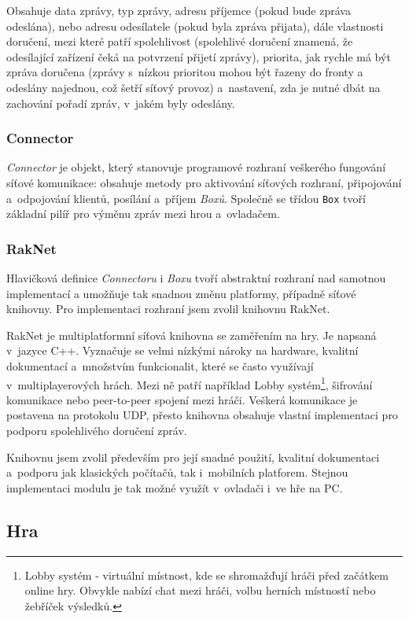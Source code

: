 \documentclass[thesis=B,czech,hidelinks]{FITthesis}[2012/06/26] %
\newcommand{\code}[1]{\texttt{#1}}
\begin{document}
Obsahuje data zprávy, typ zprávy, adresu příjemce (pokud bude zpráva odeslána), nebo adresu odesílatele (pokud byla zpráva přijata), dále vlastnosti doručení, mezi které patří spolehlivost (spolehlivé doručení znamená, že odesílající zařízení čeká na potvrzení přijetí zprávy), priorita, jak rychle má být zpráva doručena (zprávy s~nízkou prioritou mohou být řazeny do fronty a odeslány najednou, což šetří síťový provoz) a~nastavení, zda je nutné dbát na zachování pořadí zpráv, v~jakém byly odeslány.

\subsubsection{Connector}

\textit{Connector} je objekt, který stanovuje programové rozhraní veškerého fungování síťové komunikace: obsahuje metody pro aktivování síťových rozhraní, připojování a~odpojování klientů, posílání a~příjem \textit{Boxů}. Společně se třídou \code{Box} tvoří základní pilíř pro výměnu zpráv mezi hrou a~ovladačem.

\subsubsection{RakNet}

Hlavičková definice \textit{Connectoru} i \textit{Boxu} tvoří abstraktní rozhraní nad samotnou implementací a umožňuje tak snadnou změnu platformy, případně síťové knihovny. Pro implementaci rozhraní jsem zvolil knihovnu RakNet.

RakNet je multiplatformní síťová knihovna se zaměřením na hry. Je napsaná v~jazyce C++. Vyznačuje se velmi nízkými nároky na hardware, kvalitní dokumentací a~množstvím funkcionalit, které se často využívají v~multiplayerových hrách. \cite{raknet} Mezi ně patří například Lobby systém\footnote{Lobby systém - virtuální místnost, kde se shromažďují hráči před začátkem online hry. Obvykle nabízí chat mezi hráči, volbu herních místností nebo žebříček výsledků.}, šifrování komunikace nebo peer-to-peer spojení mezi hráči. Veškerá komunikace je postavena na protokolu UDP, přesto knihovna obsahuje vlastní implementaci pro podporu spolehlivého doručení zpráv.

Knihovnu jsem zvolil především pro její snadné použití, kvalitní dokumentaci a~podporu jak klasických počítačů, tak i~mobilních platforem. Stejnou implementaci modulu je tak možné využít v~ovladači i~ve hře na PC.

\subsection{Hra}
\end{document}
